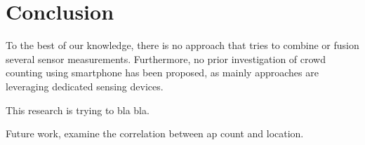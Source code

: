 \chapter{Conclusion}\label{ch:conclusion} %
To the best of our knowledge, there is no approach that tries to combine or fusion several sensor measurements. Furthermore, no prior investigation of crowd counting using smartphone has been proposed, as mainly approaches are leveraging dedicated sensing devices.

This research is trying to bla bla.

Future work, examine the correlation between ap count and location.
